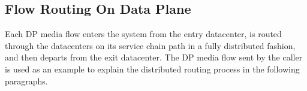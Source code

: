 \begin{comment}
\begin{equation}
0 \leq i \leq n-1, 0 \leq j \leq m+1
\label{eq1}
\end{equation}
\begin{equation}
N(0, 0) = 0, N(i, 0) = +\infty, i \geq 1
\label{eq2}
\end{equation}
\begin{equation}
N(0, j) =  N(0, j-1)+num(0,j), j \geq 1
\label{eq3}
\end{equation}
\begin{equation}
\resizebox{\columnwidth}{!}{$N(i, j) = min\{ N(i-1, j-1)+num(i, j), N(i, j-1)+num(i,j) \}$},\nonumber\\
\label{eq4}
\end{equation}
\begin{equation}
~~~~~~~~~~~~~~~~~~~~~~~~~~~i \geq 1~\text{and}~j \geq 1
\label{eq5}
\end{equation}
\begin{equation}
\resizebox{\columnwidth}{!}{
$num(i,j)=
  \begin{cases}
    0, \text{if $Q'_{i,j} \geq Q$ and $m-j+1 \geq n-i-1$}\\
    \lceil(Q-Q'_{i,j})/C_j\rceil, \text{if $Q'_{i,j}<Q$ and $m-j+1 \geq n-i-1$}\\
    +\infty, \text{if $m-j+1<n-i-1$}
  \end{cases}$}
 \label{eq6}
 \end{equation}
\end{comment}


\subsection{Flow Routing On Data Plane}
\label{sec:flow-routing-on-dp}


Each DP media flow enters the system from the entry datacenter, is routed through the datacenters on its service chain path in a fully distributed fashion, and then departs from the exit datacenter. The DP media flow sent by the caller is used as an example to explain the distributed routing process in the following paragraphs. %

